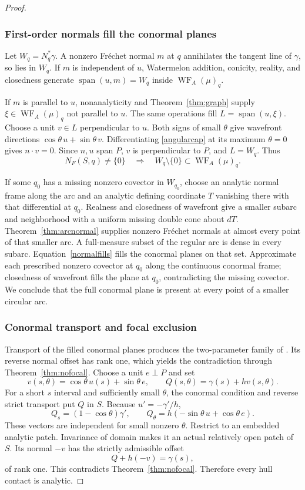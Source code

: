 \documentclass[11pt]{article}
\newcommand{\WF}{\operatorname{WF}_{A}}
\begin{document}
\begin{proof}
\subsubsection{First-order normals fill the conormal planes}
Let $W_q=N_q^*\gamma$. A nonzero Fr\'echet normal $m$ at $q$ annihilates the tangent line of $\gamma$, so lies in $W_q$. If $m$ is independent of $u$, Watermelon addition, conicity, reality, and closedness generate $\operatorname{span}(u,m)=W_q$ inside $\WF(\mu)_q$.

If $m$ is parallel to $u$, nonanalyticity and Theorem~\ref{thm:graph} supply $\xi\in\WF(\mu)_q$ not parallel to $u$. The same operations fill $L=\operatorname{span}(u,\xi)$. Choose a unit $v\in L$ perpendicular to $u$. Both signs of small $\theta$ give wavefront directions $\cos\theta\,u+\sin\theta\,v$. Differentiating \eqref{angularcap} at its maximum $\theta=0$ gives $n\cdot v=0$. Since $n,u$ span $P$, $v$ is perpendicular to $P$, and $L=W_q$. Thus
\begin{equation}\label{normalfills}
 N_F(S,q)\ne\{0\}\quad\Longrightarrow\quad
 W_q\setminus\{0\}\subset\WF(\mu)_q.
\end{equation}

If some $q_0$ has a missing nonzero covector in $W_{q_0}$, choose an analytic normal frame along the arc and an analytic defining coordinate $T$ vanishing there with that differential at $q_0$. Realness and closedness of wavefront give a smaller subarc and neighborhood with a uniform missing double cone about $dT$. Theorem~\ref{thm:arcnormal} supplies nonzero Fr\'echet normals at almost every point of that smaller arc. A full-measure subset of the regular arc is dense in every subarc. Equation~\eqref{normalfills} fills the conormal planes on that set. Approximate each prescribed nonzero covector at $q_0$ along the continuous conormal frame; closedness of wavefront fills the plane at $q_0$, contradicting the missing covector. We conclude that the full conormal plane is present at every point of a smaller circular arc.

\subsubsection{Conormal transport and focal exclusion}
Transport of the filled conormal planes produces the two-parameter family of \cite[Proposition 5.1, Step 3, p.~10]{GHL}. Its reverse normal offset has rank one, which yields the contradiction through Theorem~\ref{thm:nofocal}.
Choose a unit $e\perp P$ and set
\[
 v(s,\theta)=\cos\theta\,u(s)+\sin\theta\,e,
 \qquad Q(s,\theta)=\gamma(s)+hv(s,\theta).
\]
For a short $s$ interval and sufficiently small $\theta$, the conormal condition and reverse strict transport put $Q$ in $S$. Because $u'=-\gamma'/h$,
\[
 Q_s=(1-\cos\theta)\gamma',\qquad
 Q_\theta=h(-\sin\theta\,u+\cos\theta\,e).
\]
These vectors are independent for small nonzero $\theta$. Restrict to an embedded analytic patch. Invariance of domain makes it an actual relatively open patch of $S$. Its normal $-v$ has the strictly admissible offset
\[
 Q+h(-v)=\gamma(s),
\]
of rank one. This contradicts Theorem~\ref{thm:nofocal}. Therefore every hull contact is analytic.


\end{proof}
\end{document}
